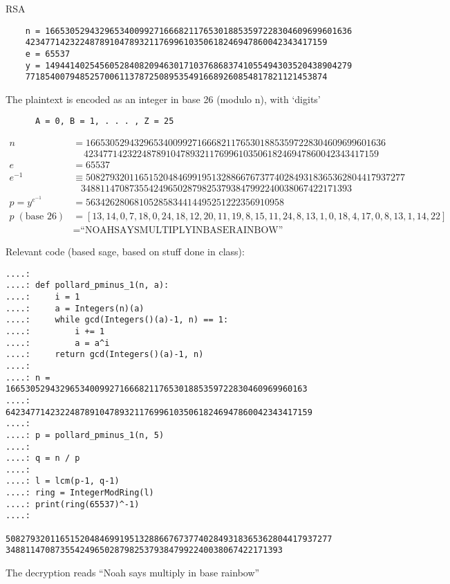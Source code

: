 \begin{problem}
  RSA

  \begin{Verbatim}
    n = 16653052943296534009927166682117653018853597228304609699601636
    4234771423224878910478932117699610350618246947860042343417159
    e = 65537
    y = 14944140254560528408209463017103768683741055494303520438904279
    7718540079485257006113787250895354916689260854817821121453874
  \end{Verbatim}
    The plaintext is encoded as an integer in base 26 (modulo n), with ‘digits’
    
    
    \begin{Verbatim}
      A = 0, B = 1, . . . , Z = 25
    \end{Verbatim}
\end{problem}
\begin{Answer}
  \begin{align*}
    n &= 16653052943296534009927166682117653018853597228304609699601636\\
      & \;\;\;\;4234771423224878910478932117699610350618246947860042343417159\\
    e &= 65537\\
    e^{-1} &\equiv 508279320116515204846991951328866767377402849318365362804417937277\\
            & \;\;\;34881147087355424965028798253793847992240038067422171393\\
    p = y^{e^{-1}} &= 56342628068105285834414495251222356910958\\
    p\; (\text{base } 26) &= [13,14,0,7,18,0,24,18,12,20,11,19,8,15,11,24,8,13,1,0,18,4,17,0,8,13,1,14,22]\\
    &= \text{``NOAHSAYSMULTIPLYINBASERAINBOW''}
  \end{align*}

  \noindent
  Relevant code (based sage, based on stuff done in class):
  \begin{Verbatim}
....:  
....: def pollard_pminus_1(n, a):  
....:     i = 1  
....:     a = Integers(n)(a)  
....:     while gcd(Integers()(a)-1, n) == 1:  
....:         i += 1 
....:         a = a^i  
....:     return gcd(Integers()(a)-1, n)  
....:  
....: n = 1665305294329653400992716668211765301885359722830460969960163
....:     64234771423224878910478932117699610350618246947860042343417159 
....:  
....: p = pollard_pminus_1(n, 5) 
....:  
....: q = n / p 
....:  
....: l = lcm(p-1, q-1) 
....: ring = IntegerModRing(l) 
....: print(ring(65537)^-1) 
....:

508279320116515204846991951328866767377402849318365362804417937277
34881147087355424965028798253793847992240038067422171393
  \end{Verbatim}

  \noindent
  The decryption reads ``Noah says multiply in base rainbow''
  
\end{Answer}
